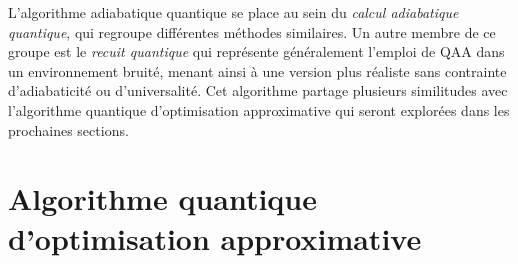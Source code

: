 L'algorithme adiabatique quantique se place au sein du \textit{calcul adiabatique quantique}, qui regroupe différentes méthodes similaires. Un autre membre de ce groupe est le \textit{recuit quantique} qui représente généralement l'emploi de QAA dans un environnement bruité, menant ainsi à une version plus réaliste sans contrainte d'adiabaticité ou d'universalité. Cet algorithme partage plusieurs similitudes avec l'algorithme quantique d'optimisation approximative qui seront explorées dans les prochaines sections. 



\section{Algorithme quantique d'optimisation approximative}
\label{sec:algorithme-quantique-d'optimisation-approximative}

